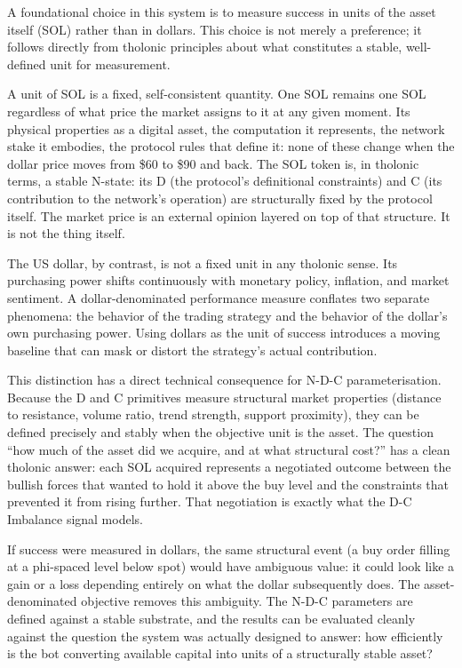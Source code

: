 \documentclass[12pt]{article}
\begin{document}
A foundational choice in this system is to measure success in units of
the asset itself (SOL) rather than in dollars. This choice is not merely
a preference; it follows directly from tholonic principles about what
constitutes a stable, well-defined unit for measurement.

A unit of SOL is a fixed, self-consistent quantity. One SOL remains one
SOL regardless of what price the market assigns to it at any given
moment. Its physical properties as a digital asset, the computation it
represents, the network stake it embodies, the protocol rules that
define it: none of these change when the dollar price moves from \$60 to
\$90 and back. The SOL token is, in tholonic terms, a stable N-state:
its D (the protocol's definitional constraints) and C (its contribution
to the network's operation) are structurally fixed by the protocol
itself. The market price is an external opinion layered on top of that
structure. It is not the thing itself.

The US dollar, by contrast, is not a fixed unit in any tholonic sense.
Its purchasing power shifts continuously with monetary policy,
inflation, and market sentiment. A dollar-denominated performance
measure conflates two separate phenomena: the behavior of the trading
strategy and the behavior of the dollar's own purchasing power. Using
dollars as the unit of success introduces a moving baseline that can
mask or distort the strategy's actual contribution.

This distinction has a direct technical consequence for N-D-C
parameterisation. Because the D and C primitives measure structural
market properties (distance to resistance, volume ratio, trend strength,
support proximity), they can be defined precisely and stably when the
objective unit is the asset. The question ``how much of the asset did we
acquire, and at what structural cost?'' has a clean tholonic answer:
each SOL acquired represents a negotiated outcome between the bullish
forces that wanted to hold it above the buy level and the constraints
that prevented it from rising further. That negotiation is exactly what
the D-C Imbalance signal models.

If success were measured in dollars, the same structural event (a buy
order filling at a phi-spaced level below spot) would have ambiguous
value: it could look like a gain or a loss depending entirely on what
the dollar subsequently does. The asset-denominated objective removes
this ambiguity. The N-D-C parameters are defined against a stable
substrate, and the results can be evaluated cleanly against the question
the system was actually designed to answer: how efficiently is the bot
converting available capital into units of a structurally stable asset?
\end{document}
